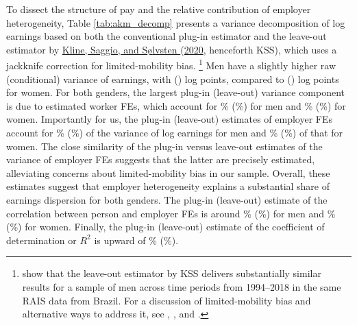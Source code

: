 To dissect the structure of pay and the relative contribution of employer heterogeneity, Table \ref{tab:akm_decomp} presents a variance decomposition of log earnings based on both the conventional plug-in estimator and the leave-out estimator by \hyperref[sec:bib]{Kline, Saggio, and S{\o}lvsten }(\hyperref[sec:bib]{2020}, henceforth KSS), which uses a jackknife correction for limited-mobility bias.%
%
\footnote{\citet{EngbomMoser2022a} show that the leave-out estimator by KSS delivers substantially similar results for a sample of men across time periods from 1994--2018 in the same RAIS data from Brazil. For a discussion of limited-mobility bias and alternative ways to address it, see \citet{BonhommeLamadonManresa2019}, \citet{BorovickovaShimer2020}, and \citet{BonhommeHolzheuLamadonManresaMogstadSetzler2023}.} %
%
Men have a slightly higher raw (conditional) variance of earnings, with  () log points, compared to  () log points for women. %
%
For both genders, the largest plug-in (leave-out) variance component is due to estimated worker FEs, which account for \% (\%) for men and \% (\%) for women. %
%
Importantly for us, the plug-in (leave-out) estimates of employer FEs account for \% (\%) of the variance of log earnings for men and \% (\%) of that for women. The close similarity of the plug-in versus leave-out estimates of the variance of employer FEs suggests that the latter are precisely estimated, alleviating concerns about limited-mobility bias in our sample. Overall, these estimates suggest that employer heterogeneity explains a substantial share of earnings dispersion for both genders. %
%
The plug-in (leave-out) estimate of the correlation between person and employer FEs is around \% (\%) for men and \% (\%) for women. %
%
Finally, the plug-in (leave-out) estimate of the coefficient of determination or $R^{2}$ is upward of \% (\%).

